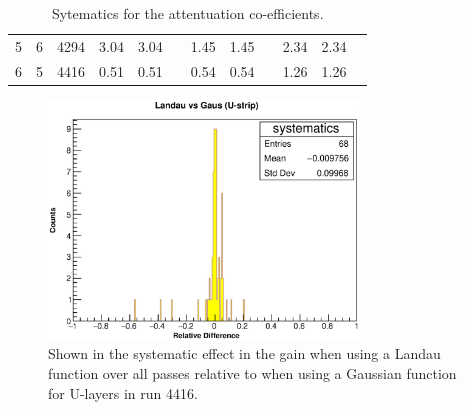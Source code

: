 \begin{table}[h]
{\begin{tabular}{|c|c|c|c|c|c|c|c|c|c|c|c|}
5                       & 6                       & 4294                 & 3.04 & 3.04                  &                       & 1.45  & 1.45                  &                       & 2.34  & 2.34                   &                       \\ \cline{1-5} \cline{7-8} \cline{10-11}
6                       & 5                       & 4416                 & 0.51 & 0.51                  &                       & 0.54  & 0.54                  &                       & 1.26  & 1.26                   &                       \\ \hline
	\end{tabular}
        }
	\label{sysTab1}
        \caption{Sytematics for the attentuation co-efficients.}
\end{table}

\begin{figure}[h]
  \centering
  \includegraphics[width=\textwidth, height = 2.5in, keepaspectratio = true]{lanVgausU-mod6sec5-4416}
  \caption{Shown in the systematic effect in the gain when using a Landau function over all passes relative to when using a Gaussian function for U-layers in run 4416.}
  \label{fig:lanVgaus}
\end{figure}

